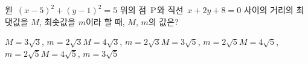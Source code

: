 원~$(x-5)^2+(y-1)^2=5$ 위의 점~$\mathrm{P}$와 직선~$x+2y+8=0$ 사이의 거리의 최댓값을 $M$, 최솟값을 $m$이라 할 때, $M$, $m$의 값은?
\begin{choicesv}{$M=3\sqrt{3}$, $m=2\sqrt{3}$}{$M=4\sqrt{3}$, $m=2\sqrt{3}$}{$M=3\sqrt{5}$, $m=2\sqrt{5}$}{$M=4\sqrt{5}$, $m=2\sqrt{5}$}{$M=4\sqrt{5}$, $m=3\sqrt{5}$}\end{choicesv}
